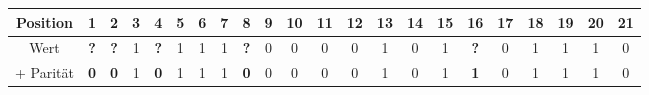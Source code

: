 \begingroup\setlength\tabcolsep{1.9pt}\scriptsize
\begin{tabular}{cccccccccccccccccccccc}
    Position   & \textbf{1} & \textbf{2} & 3 & \textbf{4} & 5 & 6 & 7 & \textbf{8} & 9 & 10 & 11 & 12 & 13 & 14 & 15 & \textbf{16} & 17 & 18 & 19 & 20 & 21 \\
    \hline
    Wert       & \textbf{?} & \textbf{?} & 1 & \textbf{?} & 1 & 1 & 1 & \textbf{?} & 0 & 0 & 0 & 0 & 1 & 0 & 1 & \textbf{?} & 0 & 1 & 1 & 1 & 0 \\
    + Parität  & \textbf{0} & \textbf{0} & 1 & \textbf{0} & 1 & 1 & 1 & \textbf{0} & 0 & 0 & 0 & 0 & 1 & 0 & 1 & \textbf{1} & 0 & 1 & 1 & 1 & 0 \\
\end{tabular}
\endgroup
